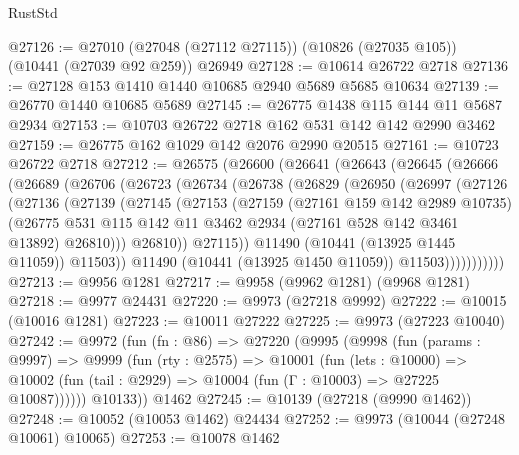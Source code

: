 \begin{lexlean}{RustStd}
\begin{coremodule}
@27126 := @27010 (@27048 (@27112 @27115)) (@10826 (@27035 @105)) (@10441 (@27039 @92 @259)) @26949
@27128 := @10614 @26722 @2718
@27136 := @27128 @153 @1410 @1440 @10685 @2940 @5689 @5685 @10634
@27139 := @26770 @1440 @10685 @5689
@27145 := @26775 @1438 @115 @144 @11 @5687 @2934
@27153 := @10703 @26722 @2718 @162 @531 @142 @142 @2990 @3462
@27159 := @26775 @162 @1029 @142 @2076 @2990 @20515
@27161 := @10723 @26722 @2718
@27212 := @26575
    (@26600
      (@26641
        (@26643
          (@26645
            (@26666
              (@26689
                (@26706
                  (@26723
                    (@26734
                      (@26738
                        (@26829
                          (@26950
                            (@26997
                              (@27126
                                (@27136
                                  (@27139
                                    (@27145
                                      (@27153
                                        (@27159
                                          (@27161 @159 @142 @2989 @10735)
                                          (@26775
                                            @531
                                            @115
                                            @142
                                            @11
                                            @3462
                                            @2934
                                            (@27161 @528 @142 @3461 @13892)
                                            @26810)))
                                      @26810))
                                  @27115))
                              @11490
                              (@10441 (@13925 @1445 @11059))
                              @11503))
                          @11490
                          (@10441 (@13925 @1450 @11059))
                          @11503)))))))))))
@27213 := @9956 @1281
@27217 := @9958 (@9962 @1281) (@9968 @1281)
@27218 := @9977 @24431
@27220 := @9973 (@27218 @9992)
@27222 := @10015 (@10016 @1281)
@27223 := @10011 @27222
@27225 := @9973 (@27223 @10040)
@27242 := @9972
    (fun (fn : @86) =>
    @27220
      (@9995
        (@9998
          (fun (params : @9997) =>
          @9999
            (fun (rty : @2575) =>
            @10001
              (fun (lets : @10000) =>
              @10002 (fun (tail : @2929) => @10004 (fun (Γ : @10003) => @27225 @10087))))))
        @10133))
    @1462
@27245 := @10139 (@27218 (@9990 @1462))
@27248 := @10052 (@10053 @1462) @24434
@27252 := @9973 (@10044 (@27248 @10061) @10065)
@27253 := @10078 @1462

\end{coremodule}
\end{lexlean}
